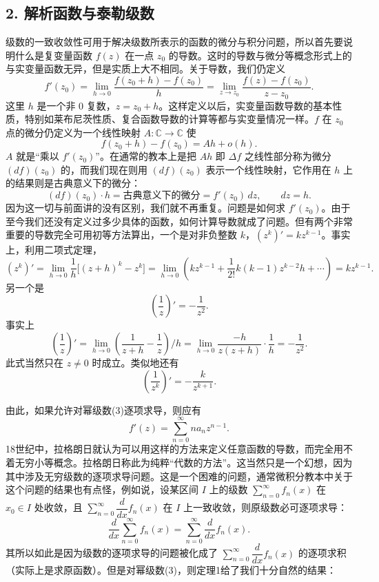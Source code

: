 
\subsection*{2. 解析函数与泰勒级数}

级数的一致收敛性可用于解决级数所表示的函数的微分与积分问题，所以首先要说明什么是复变量函数 $f(z)$ 在一点 $z_0$ 的导数。这时的导数与微分等概念形式上的与实变量函数无异，但是实质上大不相同。关于导数，我们仍定义
\begin{equation}
 f'(z_0)=\lim_{h\to0}\frac{f(z_0+h)-f(z_0)}{h}
 =\lim_{z\to z_0}\frac{f(z)-f(z_0)}{z-z_0}.
 \tag{10}
\end{equation}
这里 $h$ 是一个非 $0$ 复数，$z=z_0+h$。这样定义以后，实变量函数导数的基本性质，特别如莱布尼茨性质、复合函数导数的计算等都与实变量情况一样。$f$ 在 $z_0$ 点的微分仍定义为一个线性映射 $A:\mathbb C\to\mathbb C$ 使
\begin{equation}
 f(z_0+h)-f(z_0)=Ah+o(h).
 \tag{11}
\end{equation}
$A$ 就是“乘以 $f'(z_0)$”。在通常的教本上是把 $Ah$ 即 $\Delta f$ 之线性部分称为微分 $(df)(z_0)$ 的，而我们现在则用 $(df)(z_0)$ 表示一个线性映射，它作用在 $h$ 上的结果则是古典意义下的微分：
\[
 (df)(z_0)\cdot h=\text{古典意义下的微分}
 =f'(z_0)\,dz,\qquad dz=h.
\]
因为这一切与前面讲的没有区别，我们就不再重复。问题是如何求 $f'(z_0)$。由于至今我们还没有定义过多少具体的函数，如何计算导数就成了问题。但有两个非常重要的导数完全可用初等方法算出，一个是对非负整数 $k$，$(z^k)'=kz^{k-1}$。事实上，利用二项式定理，
\[
 (z^k)'=\lim_{h\to0}\frac1h\bigl[(z+h)^k-z^k\bigr]
 =\lim_{h\to0}\left(kz^{k-1}+\frac1{2!}k(k-1)z^{k-2}h+\cdots\right)
 =kz^{k-1}.
\]
另一个是
\[
 \left(\frac1z\right)'=-\frac1{z^2}.
\]
事实上
\[
 \left(\frac1z\right)'=\lim_{h\to0}\left(\frac1{z+h}-\frac1z\right)\bigg/h
 =\lim_{h\to0}\frac{-h}{z(z+h)}\cdot\frac1h
 =-\frac1{z^2}.
\]
此式当然只在 $z\ne0$ 时成立。类似地还有
\[
 \left(\frac1{z^k}\right)'=-\frac{k}{z^{k+1}}.
\]

由此，如果允许对幂级数(3)逐项求导，则应有
\[
 f'(z)=\sum_{n=0}^{\infty}na_nz^{n-1}.
\]
18世纪中，拉格朗日就认为可以用这样的方法来定义任意函数的导数，而完全用不着无穷小等概念。拉格朗日称此为纯粹“代数的方法”。这当然只是一个幻想，因为其中涉及无穷级数的逐项求导问题。这是一个困难的问题，通常微积分教本中关于这个问题的结果也有点怪，例如说，设某区间 $I$ 上的级数 $\sum_{n=0}^{\infty}f_n(x)$ 在 $x_0\in I$ 处收敛，且 $\sum_{n=0}^{\infty}\dfrac d{dx}f_n(x)$ 在 $I$ 上一致收敛，则原级数必可逐项求导：
\[
 \frac d{dx}\sum_{n=0}^{\infty}f_n(x)=\sum_{n=0}^{\infty}\frac d{dx}f_n(x).
\]
其所以如此是因为级数的逐项求导的问题被化成了 $\sum_{n=0}^{\infty}\dfrac d{dx}f_n(x)$ 的逐项求积（实际上是求原函数）。但是对幂级数(3)，则定理1给了我们十分自然的结果：

